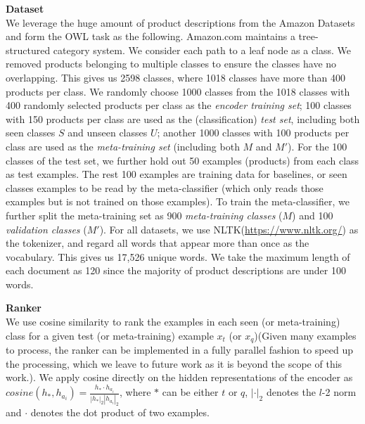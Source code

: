 \textbf{Dataset}\\
We leverage the huge amount of product descriptions from the Amazon Datasets \cite{he2016ups} and form the OWL task as the following.
Amazon.com maintains a tree-structured category system. 
We consider each path to a leaf node as a class.
We removed products belonging to multiple classes to ensure the classes have no overlapping.
This gives us 2598 classes, where 1018 classes have more than 400 products per class.
We randomly choose 1000 classes from the 1018 classes with 400 randomly selected products per class as the \textit{encoder training set};
100 classes with 150 products per class are used as the (classification) \textit{test set}, including both seen classes $S$ and unseen classes $U$;
another 1000 classes with 100 products per class are used as the \textit{meta-training set} (including both $M$ and $M'$).
For the 100 classes of the test set, we further hold out 50 examples (products) from each class as test examples. 
The rest 100 examples are training data for baselines, or seen classes examples to be read by the meta-classifier (which only reads those examples but is not trained on those examples).
To train the meta-classifier, we further split the meta-training set as 900 \textit{meta-training classes} ($M$) and 100 \textit{validation classes} ($M'$).
For all datasets, we use NLTK(\url{https://www.nltk.org/}) as the tokenizer, and regard all words that appear more than once as the vocabulary.
This gives us 17,526 unique words.
We take the maximum length of each document as 120 since the majority of product descriptions are under 100 words.

\textbf{Ranker}\\
We use cosine similarity to rank the examples in each seen (or meta-training) class for a given test (or meta-training) example $x_t$ (or $x_q$)(Given many examples to process, the ranker can be implemented in a fully parallel fashion to speed up the processing, which we leave to future work as it is beyond the scope of this work.).
We apply cosine directly on the hidden representations of the encoder as $cosine(h_*, h_{a_{i}})=\frac{h_* \cdot h_{a_{i}}}{|h_*|_2|h_{a_{i}}|_2}$, where $*$ can be either $t$ or $q$, $|\cdot|_2$ denotes the $l$-2 norm and $\cdot$ denotes the dot product of two examples.

